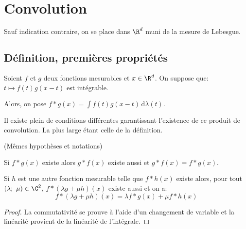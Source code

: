 %
%
%
%

\section{Convolution}

Sauf indication contraire, on se place dans $\R^d$ muni de la mesure de Lebesgue.

\subsection{Définition, premières propriétés}

\begin{de}[Convolution]
Soient $f$ et $g$ deux fonctions mesurables et $x \in \R^d$. On suppose que: $t \mapsto f(t) g(x-t)$ est intégrable.

\medskip
Alors, on pose $f*g(x) = \displaystyle{\int} f(t) g(x-t) \, \mathrm d \lambda(t)$.
\end{de}


\begin{listremarques}
\item
Il existe plein de conditions différentes garantissant l'existence de ce produit de convolution. La plus large étant celle de la définition.
\end{listremarques}

\begin{prop}
(Mêmes hypothèses et notations)

Si $f * g(x)$ existe alors $g*f (x)$ existe aussi et $g*f (x) = f*g (x)$.

\medskip
Si $h$ est une autre fonction mesurable telle que $f*h(x)$ existe alors, pour tout $(\lambda;~\mu) \in \C^2$, $f*\left ( \lambda g + \mu h\right ) (x)$ existe aussi et on a:
\[
f*\left ( \lambda g + \mu h\right ) (x) = \lambda f*g(x) + \mu f*h(x)
\]
\end{prop}

\begin{proof}
La commutativité se prouve à l'aide d'un changement de variable et la linéarité provient de la linéarité de l'intégrale.
\end{proof}

